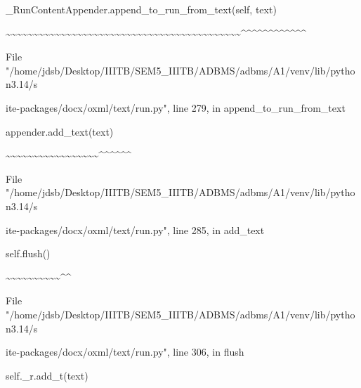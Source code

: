 \documentclass[11pt,a4paper]{article}
\begin{document}
{\_RunContentAppender.append\_to\_run\_from\_text(self, text)

\textasciitilde{}\textasciitilde{}\textasciitilde{}\textasciitilde{}\textasciitilde{}\textasciitilde{}\textasciitilde{}\textasciitilde{}\textasciitilde{}\textasciitilde{}\textasciitilde{}\textasciitilde{}\textasciitilde{}\textasciitilde{}\textasciitilde{}\textasciitilde{}\textasciitilde{}\textasciitilde{}\textasciitilde{}\textasciitilde{}\textasciitilde{}\textasciitilde{}\textasciitilde{}\textasciitilde{}\textasciitilde{}\textasciitilde{}\textasciitilde{}\textasciitilde{}\textasciitilde{}\textasciitilde{}\textasciitilde{}\textasciitilde{}\textasciitilde{}\textasciitilde{}\textasciitilde{}\textasciitilde{}\textasciitilde{}\textasciitilde{}\textasciitilde{}\textasciitilde{}\textasciitilde{}\textasciitilde{}\textasciitilde{}\textasciicircum{}\textasciicircum{}\textasciicircum{}\textasciicircum{}\textasciicircum{}\textasciicircum{}\textasciicircum{}\textasciicircum{}\textasciicircum{}\textasciicircum{}\textasciicircum{}\textasciicircum{}

File "/home/jdsb/Desktop/IIITB/SEM5\_IIITB/ADBMS/adbms/A1/venv/lib/python3.14/s

ite-packages/docx/oxml/text/run.py", line 279, in append\_to\_run\_from\_text

appender.add\_text(text)

\textasciitilde{}\textasciitilde{}\textasciitilde{}\textasciitilde{}\textasciitilde{}\textasciitilde{}\textasciitilde{}\textasciitilde{}\textasciitilde{}\textasciitilde{}\textasciitilde{}\textasciitilde{}\textasciitilde{}\textasciitilde{}\textasciitilde{}\textasciitilde{}\textasciitilde{}\textasciicircum{}\textasciicircum{}\textasciicircum{}\textasciicircum{}\textasciicircum{}\textasciicircum{}

File "/home/jdsb/Desktop/IIITB/SEM5\_IIITB/ADBMS/adbms/A1/venv/lib/python3.14/s

ite-packages/docx/oxml/text/run.py", line 285, in add\_text

self.flush()

\textasciitilde{}\textasciitilde{}\textasciitilde{}\textasciitilde{}\textasciitilde{}\textasciitilde{}\textasciitilde{}\textasciitilde{}\textasciitilde{}\textasciitilde{}\textasciicircum{}\textasciicircum{}

File "/home/jdsb/Desktop/IIITB/SEM5\_IIITB/ADBMS/adbms/A1/venv/lib/python3.14/s

ite-packages/docx/oxml/text/run.py", line 306, in flush

self.\_r.add\_t(text)

}
\end{document}
